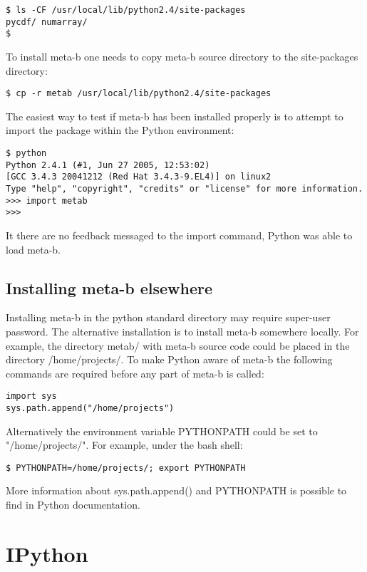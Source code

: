 \begin{verbatim}
$ ls -CF /usr/local/lib/python2.4/site-packages
pycdf/ numarray/
$ 
\end{verbatim}

To install meta-b one needs to copy meta-b source directory to
the site-packages directory:

\begin{verbatim}
$ cp -r metab /usr/local/lib/python2.4/site-packages
\end{verbatim}

The easiest way to test if meta-b has been installed properly is 
to attempt to import the package within the Python environment:

\begin{verbatim}
$ python
Python 2.4.1 (#1, Jun 27 2005, 12:53:02) 
[GCC 3.4.3 20041212 (Red Hat 3.4.3-9.EL4)] on linux2
Type "help", "copyright", "credits" or "license" for more information.
>>> import metab
>>>
\end{verbatim}

It there are no feedback messaged to the import command, Python
was able to load meta-b. 

\subsection{Installing meta-b elsewhere}

Installing meta-b in the python standard directory may require
super-user password. The alternative installation is to install
meta-b somewhere locally. For example, the directory metab/ with
meta-b source code could be placed in the directory /home/projects/.
To make Python aware of meta-b the following commands are required
before any part of meta-b is called:

\begin{verbatim}
import sys
sys.path.append("/home/projects")
\end{verbatim}

Alternatively the environment variable PYTHONPATH could be set
to "/home/projects/". For example, under the bash shell: 

\begin{verbatim}
$ PYTHONPATH=/home/projects/; export PYTHONPATH
\end{verbatim}

More information about sys.path.append() and PYTHONPATH is possible
to find in Python documentation.

\section{IPython}

